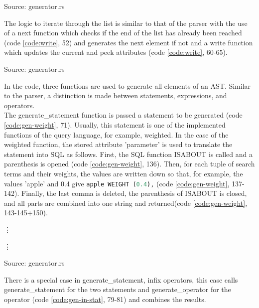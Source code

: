 \begin{codeenv}
    \label{code:gen-struct}
    
    \centerline{Source: generator.rs}
\end{codeenv}
The logic to iterate through the list is similar to that of the parser with the use of a next function which checks if the end of the list has already been reached (code \ref{code:write}, 52) and generates the next element if not and a write function which updates the current and peek attributes (code \ref{code:write}, 60-65).
\begin{codeenv}
    \label{code:write}
    
    \centerline{Source: generator.rs}
\end{codeenv}
In the code, three functions are used to generate all elements of an \ac{AST}. Similar to the parser, a distinction is made between statements, expressions, and operators.\\
The generate\_statement function is passed a statement to be generated (code \ref{code:gen-weight}, 71). Usually, this statement is one of the implemented functions of the query language, for example, weighted. In the case of the weighted function, the stored attribute 'parameter' is used to translate the statement into \ac{SQL} as follows. First, the \ac{SQL} function ISABOUT is called and a parenthesis is opened (code \ref{code:gen-weight}, 136). Then, for each tuple of search terms and their weights, the values are written down so that, for example, the values 'apple' and 0.4 give \lstinline[language=SQL]$apple WEIGHT (0.4),$ (code \ref{code:gen-weight}, 137-142). Finally, the last comma is deleted, the parenthesis of ISABOUT is closed, and all parts are combined into one string and returned(code \ref{code:gen-weight}, 143-145+150).
\begin{codeenv}
    \label{code:gen-weight}
    
    \vdots
    
    \vdots
    
    \centerline{Source: generator.rs}
\end{codeenv}
There is a special case in generate\_statement, infix operators, this case calls generate\_statement for the two statements and generate\_operator for the operator (code \ref{code:gen-in-stat}, 79-81) and combines the results.
